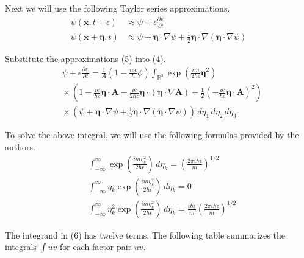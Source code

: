 \documentclass[12pt]{article}
\newcommand\INT{\int_{\mathbb R^3}}
\begin{document}
Next we will use the following Taylor series approximations.
\begin{equation*}
\begin{aligned}
\psi(\mathbf x,t+\epsilon)&\approx\psi+\epsilon\frac{\partial\psi}{\partial t}
\\
\psi(\mathbf x+\boldsymbol\eta,t)&\approx\psi+\boldsymbol\eta\cdot\nabla\psi
+\tfrac{1}{2}\boldsymbol\eta\cdot\nabla(\boldsymbol\eta\cdot\nabla\psi)
\end{aligned}
\tag{5}
\end{equation*}

Substitute the approximations (5) into (4).
\begin{align*}
&\psi+\epsilon\frac{\partial\psi}{\partial t}=
\frac{1}{A}
\left(1-\frac{ie\epsilon}{\hbar}\phi\right)
\INT\exp\left(\frac{im}{2\hbar\epsilon}\boldsymbol\eta^2\right)
\\
&{}\times\left(
1
-\frac{ie}{\hbar c}\boldsymbol\eta\cdot\mathbf A
-\frac{ie}{2\hbar c}\boldsymbol\eta\cdot(\boldsymbol\eta\cdot\nabla\mathbf A)
+\frac{1}{2}\left(-\frac{ie}{\hbar c}\boldsymbol\eta\cdot\mathbf A\right)^2
\right)
\\
&{}\times\left(
\psi+\boldsymbol\eta\cdot\nabla\psi
+\tfrac{1}{2}\boldsymbol\eta\cdot\nabla(\boldsymbol\eta\cdot\nabla\psi)
\right)
\,d\eta_1\,d\eta_2\,d\eta_3
\tag{6}
\end{align*}

To solve the above integral, we will use the following formulas provided by the authors.
\begin{align*}
&\int_{-\infty}^\infty\exp\left(\frac{im\eta_k^2}{2\hbar\epsilon}\right)\,d\eta_k
=\left(\frac{2\pi i\hbar\epsilon}{m}\right)^{1/2}
\tag{4.7}
\\
&\int_{-\infty}^\infty\eta_k\exp\left(\frac{im\eta_k^2}{2\hbar\epsilon}\right)\,d\eta_k
=0
\tag{4.9}
\\
&\int_{-\infty}^\infty\eta_k^2\exp\left(\frac{im\eta_k^2}{2\hbar\epsilon}\right)\,d\eta_k
=\frac{i\hbar\epsilon}{m}\left(\frac{2\pi i\hbar\epsilon}{m}\right)^{1/2}
\tag{4.10}
\end{align*}

The integrand in (6) has twelve terms.
The following table summarizes the integrals $\int uv$ for each factor pair $uv$.
\end{document}
